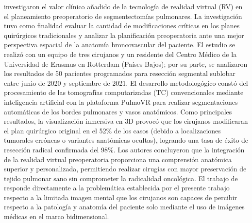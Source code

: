 \begin{sectext}
        \textcite{bakhuis_essential_2023} investigaron el valor clínico añadido de la tecnología de realidad virtual (RV) en el planeamiento preoperatorio de segmentectomías pulmonares. La investigación tuvo como finalidad evaluar la cantidad de modificaciones críticas en los planes quirúrgicos tradicionales y analizar la planificación preoperatoria ante una mejor perspectiva espacial de la anatomía broncovascular del paciente. El estudio se realizó con un equipo de tres cirujanos y un residente del Centro Médico de la Universidad de Erasmus en Rotterdam (Países Bajos); por su parte, se analizaron los resultados de 50 pacientes programados para resección segmental sublobar entre junio de 2020 y septiembre de 2021. El desarrollo metodologógico constó del procesamiento de las tomografías computarizadas (TC) convencionales mediante inteligencia artificial con la plataforma PulmoVR para realizar segmentaciones automáticas de los bordes pulmonares y vasos anatómicos. Como principales resultados, la visualización inmersiva en 3D provocó que los cirujanos modificaran el plan quirúrgico original en el 52\% de los casos (debido a localizaciones tumorales erróneas o variantes anatómicas ocultas), logrando una tasa de éxito de resección radical confirmada del 98\%. Los autores concluyeron que la integración de la realidad virtual preoperatoria proporciona una comprensión anatómica superior y personalizada, permitiendo realizar cirugías con mayor preservación de tejido pulmonar sano sin comprometer la radicalidad oncológica. El trabajo de \textcite{bakhuis_essential_2023} responde directamente a la problemática establecida por el presente trabajo respecto a la limitada imagen mental que los cirujanos son capaces de percibir respecto a la patología y anatomía del paciente solo mediante el uso de imágenes médicas en el marco bidimensional. \newline
    \end{sectext}
    

